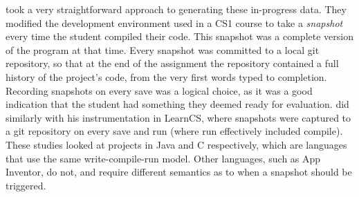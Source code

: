 \citet{piech-2012} took a very straightforward approach to generating these in-progress data. They modified the development environment used in a CS1 course to take a \emph{snapshot} every time the student compiled their code. This snapshot was a complete version of the program at that time. Every snapshot was committed to a local git repository, so that at the end of the assignment the repository contained a full history of the project's code, from the very first words typed to completion. Recording snapshots on every save was a logical choice, as it was a good indication that the student had something they deemed ready for evaluation. \citet{lipman-phd} did similarly with his instrumentation in LearnCS, where snapshots were captured to a git repository on every save and run (where run effectively included compile). These studies looked at projects in Java and C respectively, which are languages that use the same write-compile-run model. Other languages, such as App Inventor, do not, and require different semantics as to when a snapshot should be triggered.


\label{sec:teacher-dashboards}


